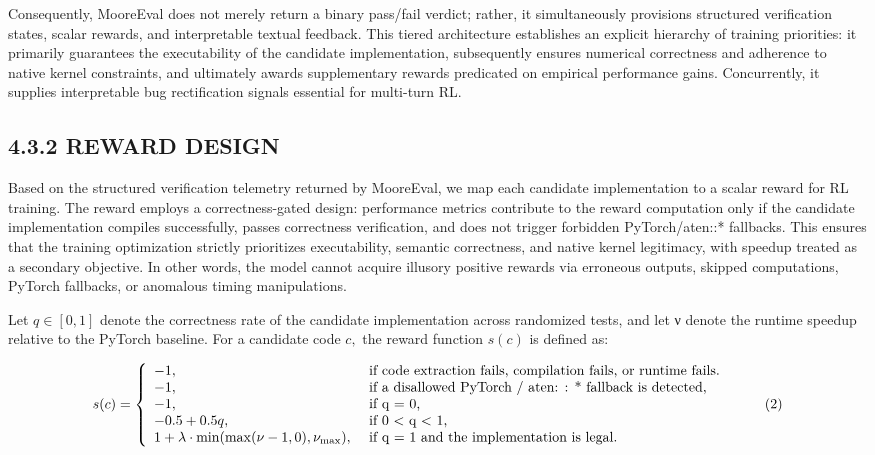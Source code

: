 \documentclass[
  10
]{article}
\begin{document}
Consequently, MooreEval does not merely return a binary pass/fail
verdict; rather, it simultaneously provisions structured verification
states, scalar rewards, and interpretable textual feedback. This tiered
architecture establishes an explicit hierarchy of training priorities:
it primarily guarantees the executability of the candidate
implementation, subsequently ensures numerical correctness and adherence
to native kernel constraints, and ultimately awards supplementary
rewards predicated on empirical performance gains. Concurrently, it
supplies interpretable bug rectification signals essential for
multi-turn RL.

\subsection{4.3.2 REWARD DESIGN}\label{reward-design}

Based on the structured verification telemetry returned by MooreEval, we
map each candidate implementation to a scalar reward for RL training.
The reward employs a correctness-gated design: performance metrics
contribute to the reward computation only if the candidate
implementation compiles successfully, passes correctness verification,
and does not trigger forbidden PyTorch/aten::* fallbacks. This ensures
that the training optimization strictly prioritizes executability,
semantic correctness, and native kernel legitimacy, with speedup treated
as a secondary objective. In other words, the model cannot acquire
illusory positive rewards via erroneous outputs, skipped computations,
PyTorch fallbacks, or anomalous timing manipulations.

Let \(q \in [ 0 , 1 ]\) denote the correctness rate of the candidate
implementation across randomized tests, and let ν denote the runtime
speedup relative to the PyTorch baseline. For a candidate code \(c ,\)
the reward function \(s ( c )\) is defined as:

\[
s (c) = \left\{ \begin{array}{l l} - 1, & \text { if   code   extraction   fails,   compilation   fails,   or   runtime   fails. } \\ - 1, & \text { if   a   disallowed   PyTorch / aten: : *   fallback   is   detected, } \\ - 1, & \text { if   q = 0, } \\ - 0. 5 + 0. 5 q, & \text { if   0 <   q <   1, } \\ 1 + \lambda \cdot \min (\max (\nu - 1, 0), \nu_ {\max}), & \text { if   q = 1   and   the   implementation   is   legal. } \end{array} \right.\tag{2}
\]
\end{document}
